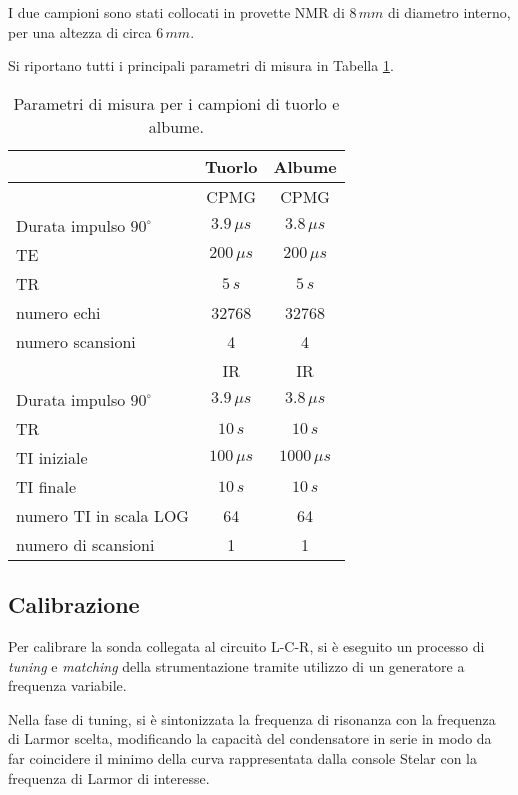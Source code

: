 I due campioni sono stati collocati in provette NMR di $8\si{\,}{mm}$ di diametro interno, per una altezza di circa $6\si{\,}{mm}$.

Si riportano tutti i principali parametri di misura in Tabella \ref{tab:setup}.

\begin{table}[h!]
	\centering
	\begin{tabular}{|l|c|c|}
	\toprule
						& \textbf{Tuorlo}& \textbf{Albume}	\\
	\midrule
						& CPMG 			& CPMG 				\\
	\midrule
	Durata impulso $90^{\circ}$ & $3.9\si{\,}{\mu s} $& $3.8\si{\,}{\mu s}$ \\
	TE 					& $200\si{\,}{\mu s} $	& $200\si{\,}{\mu s}$ \\
	TR 					& $5\si{\,}{s}$ 	& $5\si{\,}{s}$ \\
	numero echi 		& 32768 		& 32768 \\
	numero scansioni 	& 4 			& 4 \\
	\midrule
	\midrule
						& IR			& IR				\\
	\midrule
	Durata impulso $90^{\circ}$ & $3.9\si{\,}{\mu s} $& $3.8\si{\,}{\mu s}$ \\
	TR 					& $10\si{\,}{s}$	& $10\si{\,}{s}$ \\
	TI iniziale 	 	&$100\si{\,}{\mu s}$& $1000\si{\,}{\mu s}$ \\
	TI finale 		 	& $10\si{\,}{s}$	& $10\si{\,}{s}$ \\
	numero TI in scala LOG & 64			& 64 \\
	numero di scansioni & 1				& 1 \\
	\bottomrule
	\end{tabular}
	\caption{Parametri di misura per i campioni di tuorlo e albume.}\label{tab:setup}
\end{table}


\subsection*{Calibrazione}

Per calibrare la sonda collegata al circuito L-C-R, si è eseguito un processo di \textit{tuning} e \textit{matching} della strumentazione tramite utilizzo di un generatore a frequenza variabile.

Nella fase di tuning, si è sintonizzata la frequenza di risonanza con la frequenza di Larmor scelta, modificando la capacità del condensatore in serie in modo da far coincidere il minimo della curva rappresentata dalla console Stelar con la frequenza di Larmor di interesse.

